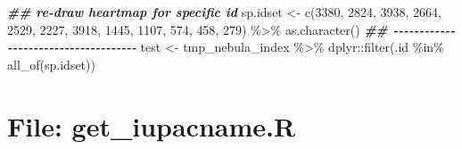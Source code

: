 \documentclass[
]{article}
\newenvironment{Shaded}{\begin{snugshade}}{\end{snugshade}}
\newcommand{\DecValTok}[1]{\textcolor[rgb]{0.00,0.00,0.81}{#1}}
\newcommand{\DocumentationTok}[1]{\textcolor[rgb]{0.56,0.35,0.01}{\textbf{\textit{#1}}}}
\newcommand{\FunctionTok}[1]{\textcolor[rgb]{0.00,0.00,0.00}{#1}}
\newcommand{\NormalTok}[1]{#1}
\newcommand{\OtherTok}[1]{\textcolor[rgb]{0.56,0.35,0.01}{#1}}
\newcommand{\SpecialCharTok}[1]{\textcolor[rgb]{0.00,0.00,0.00}{#1}}
\begin{document}
\begin{Shaded}
\begin{Highlighting}[]
\DocumentationTok{\#\#  re{-}draw heartmap for specific id}
\NormalTok{sp.idset }\OtherTok{\textless{}{-}} \FunctionTok{c}\NormalTok{(}\DecValTok{3380}\NormalTok{, }\DecValTok{2824}\NormalTok{, }\DecValTok{3938}\NormalTok{, }\DecValTok{2664}\NormalTok{, }\DecValTok{2529}\NormalTok{,}
              \DecValTok{2227}\NormalTok{, }\DecValTok{3918}\NormalTok{, }\DecValTok{1445}\NormalTok{, }\DecValTok{1107}\NormalTok{,}
              \DecValTok{574}\NormalTok{, }\DecValTok{458}\NormalTok{, }\DecValTok{279}\NormalTok{) }\SpecialCharTok{\%\textgreater{}\%} 
  \FunctionTok{as.character}\NormalTok{()}
\DocumentationTok{\#\# {-}{-}{-}{-}{-}{-}{-}{-}{-}{-}{-}{-}{-}{-}{-}{-}{-}{-}{-}{-}{-}{-}{-}{-}{-}{-}{-}{-}{-}{-}{-}{-}{-}{-}{-}{-}{-} }
\NormalTok{test }\OtherTok{\textless{}{-}}\NormalTok{ tmp\_nebula\_index }\SpecialCharTok{\%\textgreater{}\%} 
\NormalTok{  dplyr}\SpecialCharTok{::}\FunctionTok{filter}\NormalTok{(.id }\SpecialCharTok{\%in\%} \FunctionTok{all\_of}\NormalTok{(sp.idset))}
\end{Highlighting}
\end{Shaded}

\hypertarget{file-get_iupacname.r}{%
\section{File: get\_iupacname.R}\label{file-get_iupacname.r}}
\end{document}
